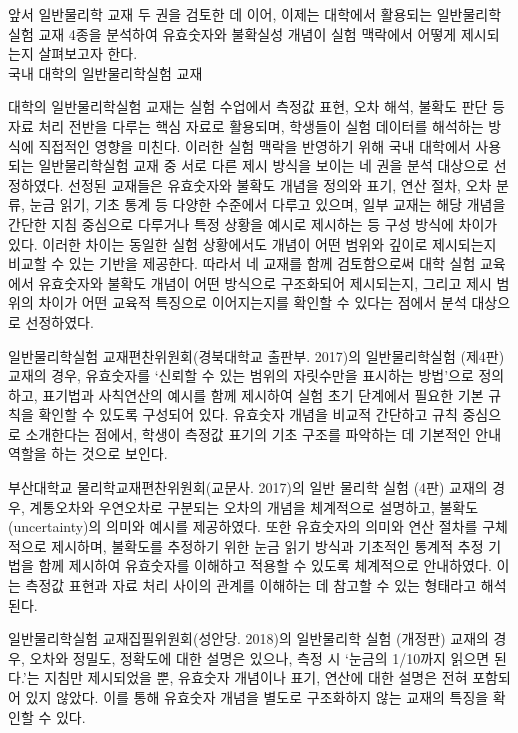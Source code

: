 앞서 일반물리학 교재 두 권을 검토한 데 이어,
이제는 대학에서 활용되는 일반물리학실험 교재 4종을 분석하여
유효숫자와 불확실성 개념이 실험 맥락에서 어떻게 제시되는지 살펴보고자 한다. \\

\ganada 국내 대학의 일반물리학실험 교재

대학의 일반물리학실험 교재는 실험 수업에서 측정값 표현, 오차 해석, 불확도 판단 등
자료 처리 전반을 다루는 핵심 자료로 활용되며, 학생들이 실험 데이터를 해석하는 방식에
직접적인 영향을 미친다.
%
이러한 실험 맥락을 반영하기 위해 국내 대학에서 사용되는 일반물리학실험 교재 중
서로 다른 제시 방식을 보이는 네 권을 분석 대상으로 선정하였다.
%
선정된 교재들은 유효숫자와 불확도 개념을 정의와 표기, 연산 절차, 오차 분류, 눈금 읽기,
기초 통계 등 다양한 수준에서 다루고 있으며, 일부 교재는 해당 개념을 간단한 지침 중심으로
다루거나 특정 상황을 예시로 제시하는 등 구성 방식에 차이가 있다.
%
이러한 차이는 동일한 실험 상황에서도 개념이 어떤 범위와 깊이로 제시되는지
비교할 수 있는 기반을 제공한다.
%
따라서 네 교재를 함께 검토함으로써 대학 실험 교육에서 유효숫자와 불확도 개념이
어떤 방식으로 구조화되어 제시되는지, 그리고 제시 범위의 차이가 어떤 교육적 특징으로
이어지는지를 확인할 수 있다는 점에서 분석 대상으로 선정하였다.

일반물리학실험 교재편찬위원회(경북대학교 출판부. 2017)의
일반물리학실험 (제4판) 교재의 경우,
유효숫자를 `신뢰할 수 있는 범위의 자릿수만을 표시하는 방법'으로 정의하고,
표기법과 사칙연산의 예시를 함께 제시하여 실험 초기 단계에서 필요한
기본 규칙을 확인할 수 있도록 구성되어 있다.
유효숫자 개념을 비교적 간단하고 규칙 중심으로 소개한다는 점에서,
학생이 측정값 표기의 기초 구조를 파악하는 데 기본적인 안내 역할을 하는 것으로 보인다.

부산대학교 물리학교재편찬위원회(교문사. 2017)의
일반 물리학 실험 (4판) 교재의 경우,
계통오차와 우연오차로 구분되는 오차의 개념을 체계적으로 설명하고,
불확도(uncertainty)의 의미와 예시를 제공하였다.
또한 유효숫자의 의미와 연산 절차를 구체적으로 제시하며,
불확도를 추정하기 위한 눈금 읽기 방식과
기초적인 통계적 추정 기법을 함께 제시하여 유효숫자를 이해하고
적용할 수 있도록 체계적으로 안내하였다.
이는 측정값 표현과 자료 처리 사이의 관계를 이해하는 데 참고할 수 있는 형태라고 해석된다.

일반물리학실험 교재집필위원회(성안당. 2018)의
일반물리학 실험 (개정판) 교재의 경우,
오차와 정밀도, 정확도에 대한 설명은 있으나, 측정 시 `눈금의 1/10까지 읽으면 된다.'는
지침만 제시되었을 뿐, 유효숫자 개념이나 표기, 연산에 대한 설명은 전혀 포함되어 있지 않았다.
이를 통해 유효숫자 개념을 별도로 구조화하지 않는 교재의 특징을 확인할 수 있다.

